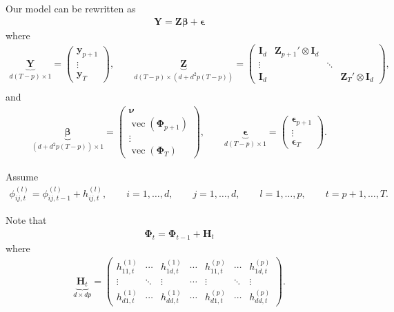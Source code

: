 \documentclass[fleqn]{article}
\begin{document}
Our model can be rewritten as
\begin{align*}
    \bm Y = \bm Z \bm \beta + \bm \epsilon
\end{align*}
where
\begin{align*}
    \underbrace{\bm Y}_{d(T-p) \times 1} = \begin{pmatrix}
        \bm y_{p+1} \\
        \vdots \\
        \bm y_T
    \end{pmatrix},
    \qquad
    \underbrace{\bm Z}_{d(T-p) \times (d + d^2p(T-p))} =
    \begin{pmatrix}
        \bm I_d & \bm Z_{p+1}' \otimes \bm I_d &        &                            \\
        \vdots  &                              & \ddots &                            \\
        \bm I_d &                              &        & \bm Z_{T}' \otimes \bm I_d
    \end{pmatrix}, \\
\end{align*}
and
\begin{align*}
    \underbrace{\bm \beta}_{(d + d^2p(T-p)) \times 1}
    = \begin{pmatrix}
        \bm \nu \\
        \operatorname{vec}(\bm \Phi_{p+1}) \\
        \vdots \\
        \operatorname{vec}(\bm \Phi_{T})
    \end{pmatrix},
    \qquad
    \underbrace{\bm \epsilon}_{d(T-p) \times 1}
    = \begin{pmatrix}
        \bm \epsilon_{p+1} \\
        \vdots \\
        \bm \epsilon_T
    \end{pmatrix}.
\end{align*}

Assume
\begin{align*}
    \phi^{(l)}_{ij, t} = \phi^{(l)}_{ij, t-1} + h^{(l)}_{ij, t},
    \qquad i = 1, \dots, d,
    \qquad j = 1, \dots, d,
    \qquad l = 1, \dots, p,
    \qquad t = p+1, \dots, T.
\end{align*}

Note that
\begin{align*}
    \bm \Phi_t = \bm \Phi_{t-1} + \bm H_t
\end{align*}
where
\begin{align*}
    \underbrace{\bm H_t}_{d \times dp} = \begin{pmatrix}
        h^{(1)}_{11, t} & \cdots & h^{(1)}_{1d, t} & \cdots & h^{(p)}_{11, t} & \cdots & h^{(p)}_{1d, t} \\
        \vdots          & \ddots & \vdots          & \cdots & \vdots          & \ddots & \vdots \\
        h^{(1)}_{d1, t} & \cdots & h^{(1)}_{dd, t} & \cdots & h^{(p)}_{d1, t} & \cdots & h^{(p)}_{dd, t}
    \end{pmatrix}.
\end{align*}
\end{document}
